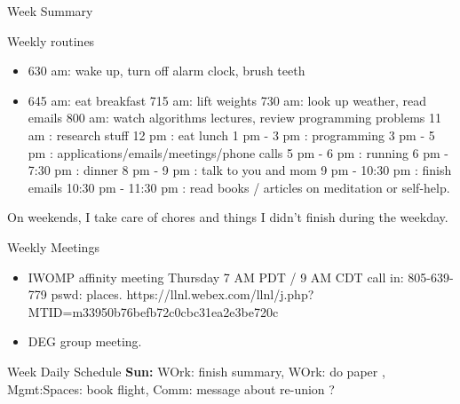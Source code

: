 \documentclass[serif, mathserif, final]{beamer}
\begin{document}
\begin{frame}
\begin{columns}
\begin{column}{0.5\linewidth}
\begin{block}{Week Summary}
      \begin{block}{Weekly routines} 
        \begin{itemize}
          \tiny \item \tiny 630 am: wake up, turn off alarm clock, brush teeth
        \item \tiny 645 am: eat breakfast
          715 am: lift weights
          730 am: look up weather, read emails
          800 am: watch algorithms lectures, review programming problems
          11 am : research stuff
          12 pm : eat lunch
          1 pm - 3 pm : programming
          3 pm - 5 pm : applications/emails/meetings/phone calls
          5 pm  - 6 pm : running
          6 pm  - 7:30 pm : dinner
          8 pm - 9 pm : talk to you and mom
          9 pm - 10:30 pm : finish emails
          10:30 pm - 11:30 pm : read books / articles on meditation or self-help.
        \end{itemize}         
        On weekends, I take care of chores and things I didn't finish during
        the weekday. 
      \end{block} 
      
      \begin{block}{Weekly Meetings}
        \begin{itemize} 
        \item \tiny IWOMP affinity meeting Thursday 7 AM PDT / 9 AM
          CDT call in: 805-639-779 pswd: places. 
          https://llnl.webex.com/llnl/j.php?MTID=m33950b76befb72c0cbc31ea2e3be720c  
        \item \tiny DEG group meeting.  
        \end{itemize}



\end{block} 
      
      \begin{block}{Week Daily Schedule} 
        {\bf Sun:} WOrk: finish summary,   WOrk: do paper ,
        Mgmt:Spaces: book flight, Comm: message about re-union ? 
      \end{block} 
      

\end{block}
\end{column}
\end{columns}
\end{frame}
\end{document}
